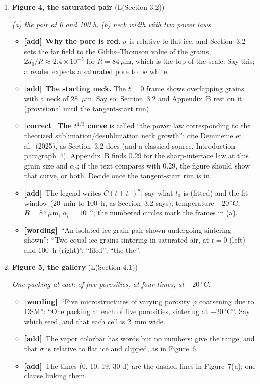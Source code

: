 \documentclass[11pt]{article}
\newcommand{\Pg}[3]{\item \textbf{#1} {\small(#2)}\par\textit{#3}}
\newcommand{\tC}{\textcolor{miss}{\textbf{[correct]}}\ }
\newcommand{\tG}{\textcolor{stale}{\textbf{[wording]}}\ }
\newcommand{\tA}{\textcolor{have}{\textbf{[add]}}\ }
\begin{document}
\begin{enumerate}
\Pg{Figure 4, the saturated pair}{L(Section 3.2)}{(a) the pair at 0 and 100 h, (b) neck width with two power laws.}
  \begin{itemize}
  \item \tA \textbf{Why the pore is red.} $\sigma$ is relative to flat ice,
    and Section~3.2 sets the far field to the Gibbs--Thomson value of the
    grains, $2d_0/R \approx 2.4\times10^{-5}$ for $R = 84~\mu$m, which is
    the top of the scale. Say this; a reader expects a saturated pore to be
    white.
  \item \tA \textbf{The starting neck.} The $t = 0$ frame shows overlapping
    grains with a neck of 28~$\mu$m. Say so; Section~3.2 and Appendix~B
    rest on it (provisional until the tangent-start run).
  \item \tC \textbf{The $t^{1/3}$ curve} is called ``the power law
    corresponding to the theorized sublimation/desublimation neck growth'':
    cite Demmenie et al.\ (2025), as Section~3.2 does (and a classical
    source, Introduction paragraph~4). Appendix~B finds 0.29 for
    the sharp-interface law at this grain size and $\alpha_c$; if the text
    compares with 0.29, the figure should show that curve, or both. Decide
    once the tangent-start run is in.
  \item \tA The legend writes $C(t+t_0)^{a}$; say what $t_0$ is (fitted)
    and the fit window (20~min to 100~h, as Section~3.2 says); temperature $-20\,^{\circ}$C, $R = 84~\mu$m,
    $\alpha_c = 10^{-3}$; the numbered circles mark the frames in (a).
  \item \tG ``An isolated ice grain pair shown undergoing sintering shown'':
    ``Two equal ice grains sintering in saturated air, at $t = 0$ (left)
    and 100~h (right)''. ``filed'', ``the the''.
  \end{itemize}
\Pg{Figure 5, the gallery}{L(Section 4.1)}{One packing at each of five porosities, at four times, at $-20\,^{\circ}$C.}
  \begin{itemize}
  \item \tG ``Five microstructures of varying porosity $\varphi$ coarsening
    due to DSM'': ``One packing at each of five porosities, sintering at
    $-20\,^{\circ}$C''. Say which seed, and that each cell is 2~mm wide.
  \item \tA The vapor colorbar has words but no numbers: give the range, and
    that $\sigma$ is relative to flat ice and clipped, as in Figure~6.
  \item \tA The times (0, 10, 19, 30 d) are the dashed lines in
    Figure~7(a); one clause linking them.

\end{itemize}
\end{enumerate}
\end{document}
